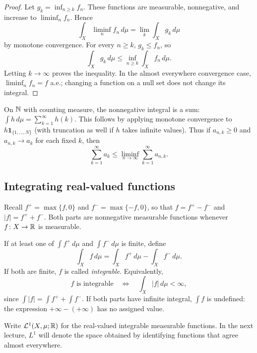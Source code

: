 \begin{proof}
  Let $g_k=\inf_{n\geq k}f_n$. These functions are measurable,
  nonnegative, and increase to $\liminf_n f_n$. Hence
  \[
    \int_X\liminf_n f_n\,d\mu
      =\lim_k\int_X g_k\,d\mu
  \]
  by monotone convergence. For every $n\geq k$, $g_k\leq f_n$, so
  \[
    \int_X g_k\,d\mu\leq\inf_{n\geq k}\int_X f_n\,d\mu.
  \]
  Letting $k\to\infty$ proves the inequality. In the almost everywhere
  convergence case, $\liminf_n f_n=f$ a.e.; changing a function on a
  null set does not change its integral.
\end{proof}

\begin{example}
  On $\mathbb{N}$ with counting measure, the nonnegative integral is a sum:
  $\int h\,d\mu=\sum_{k=1}^{\infty}h(k)$. This follows by applying
  monotone convergence to $h\mathbf 1_{\{1,\ldots,N\}}$ (with
  truncation as well if $h$ takes infinite values). Thus if
  $a_{n,k}\geq0$ and $a_{n,k}\to a_k$ for each fixed $k$, then
  \[
    \sum_{k=1}^{\infty}a_k
      \leq\liminf_{n\to\infty}\sum_{k=1}^{\infty}a_{n,k}.
  \]
\end{example}

\FloatBarrier

\subsection{Integrating real-valued functions}

Recall $f^+=\max\{f,0\}$ and $f^-=\max\{-f,0\}$, so that
$f=f^+-f^-$ and $|f|=f^++f^-$. Both parts are nonnegative measurable
functions whenever $f\colon X\to\mathbb{R}$ is measurable.

\begin{definition}
  If at least one of $\int f^+\,d\mu$ and $\int f^-\,d\mu$ is finite,
  define
  \[
    \int_X f\,d\mu=\int_X f^+\,d\mu-\int_X f^-\,d\mu.
  \]
  If both are finite, $f$ is called \emph{integrable}. Equivalently,
  \[
    f\text{ is integrable}\quad\Longleftrightarrow\quad
    \int_X|f|\,d\mu<\infty,
  \]
  since $\int|f|=\int f^++\int f^-$. If both parts have infinite
  integral, $\int f$ is undefined: the expression
  $+\infty-(+\infty)$ has no assigned value.
\end{definition}

Write $\mathcal L^1(X,\mu;\mathbb{R})$ for the real-valued integrable
measurable functions. In the next lecture, $L^1$ will denote the space
obtained by identifying functions that agree almost everywhere.

